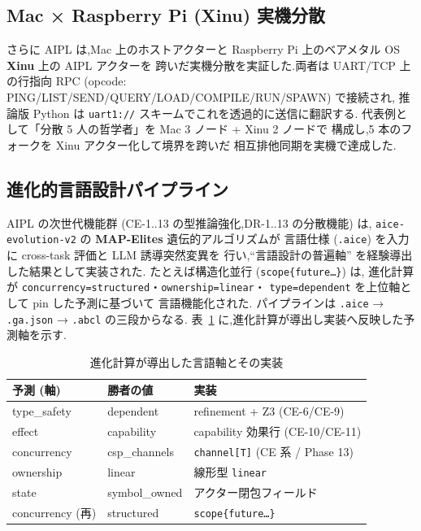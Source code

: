 \documentclass[11pt,a4paper]{article}
\newcommand{\code}[1]{\texttt{\small #1}}
\begin{document}
\subsection{Mac × Raspberry Pi (Xinu) 実機分散}
さらに AIPL は,Mac 上のホストアクターと
Raspberry Pi 上のベアメタル OS \textbf{Xinu} 上の AIPL アクターを
跨いだ実機分散を実証した.両者は UART/TCP 上の行指向 RPC
(opcode: PING/LIST/SEND/QUERY/LOAD/COMPILE/RUN/SPAWN) で接続され,
推論版 Python は \code{uart1://} スキームでこれを透過的に送信に翻訳する.
代表例として「分散 5 人の哲学者」を Mac 3 ノード + Xinu 2 ノードで
構成し,5 本のフォークを Xinu アクター化して境界を跨いだ
相互排他同期を実機で達成した.

\subsection{進化的言語設計パイプライン}\label{sec:evo}
AIPL の次世代機能群 (CE-1..13 の型推論強化,DR-1..13 の分散機能) は,
\code{aice-evolution-v2} の \textbf{MAP-Elites} 遺伝的アルゴリズムが
言語仕様 (\code{.aice}) を入力に cross-task 評価と LLM 誘導突然変異を
行い,``言語設計の普遍軸'' を経験導出した結果として実装された.
たとえば構造化並行 (\code{scope\{future\dots\}}) は,
進化計算が \code{concurrency=structured}・\code{ownership=linear}・
\code{type=dependent} を上位軸として pin した予測に基づいて
言語機能化された.
パイプラインは \code{.aice} → \code{.ga.json} → \code{.abcl} の三段からなる.
表~\ref{tab:evo} に,進化計算が導出し実装へ反映した予測軸を示す.

\begin{table}[h]
\centering\small
\caption{進化計算が導出した言語軸とその実装}\label{tab:evo}
\begin{tabularx}{\linewidth}{@{}l l X@{}}
\toprule
予測 (軸) & 勝者の値 & 実装 \\
\midrule
type\_safety & dependent & refinement + Z3 (CE-6/CE-9) \\
effect & capability & capability 効果行 (CE-10/CE-11) \\
concurrency & csp\_channels & \code{channel[T]} (CE 系 / Phase 13) \\
ownership & linear & 線形型 \code{linear} \\
state & symbol\_owned & アクター閉包フィールド \\
concurrency (再) & structured & \code{scope\{future\dots\}} \\
\bottomrule
\end{tabularx}
\end{table}
\end{document}
